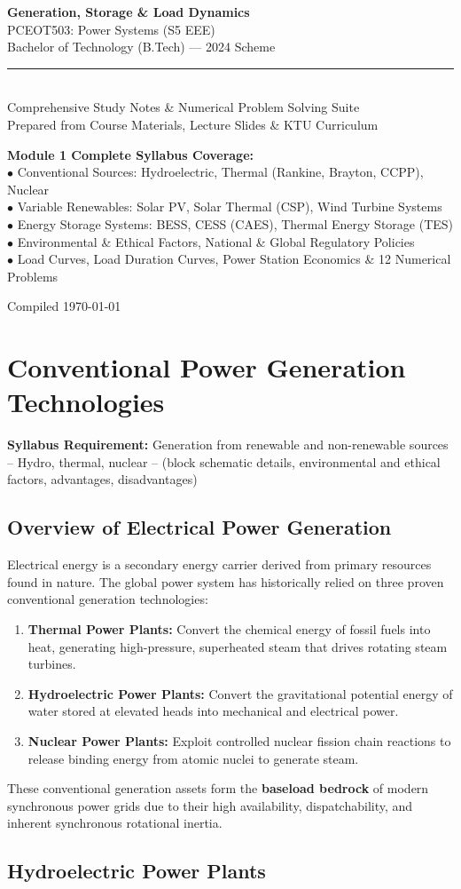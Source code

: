 \documentclass[11pt,a4paper]{article}
\newcommand{\docsubject}{PCEOT503: Power Systems (S5 EEE)}
\newcommand{\doctitle}{Generation, Storage \& Load Dynamics}
\newcommand{\syllabusitem}[1]{%
  \begin{tcolorbox}[enhanced, colback=AnthOrange!8, colframe=AnthOrange, boxrule=0.4pt, arc=3pt, left=7pt, right=7pt, top=3pt, bottom=3pt]
    \small\sffamily\textbf{\color{AnthOrange}Syllabus Requirement:} #1
  \end{tcolorbox}
}
\newcommand{\maketitlepage}{%
  \begin{titlepage}
    \pagecolor{AnthDark}
    \color{AnthLight}
    \vspace*{2.2cm}
    \begin{center}
      {\huge\bfseries\sffamily \doctitle}\\[0.8em]
      {\Large\sffamily\color{AnthOrange} \docsubject}\\[0.4em]
      {\large\sffamily\color{AnthMidGray} Bachelor of Technology (B.Tech) — 2024 Scheme}\\[2.0em]
      \color{AnthOrange}\rule{0.5\textwidth}{1.2pt}\\[1.8em]
      {\normalsize\sffamily\color{AnthLightGray} Comprehensive Study Notes \& Numerical Problem Solving Suite}\\[0.4em]
      {\small\sffamily\color{AnthMidGray} Prepared from Course Materials, Lecture Slides \& KTU Curriculum}\\[2.8em]
      \begin{tcolorbox}[enhanced, width=0.84\textwidth, colback=AnthDark!90, colframe=AnthOrange!60, arc=4pt, boxrule=0.6pt]
        \centering\small\sffamily\color{AnthLight}
        \textbf{Module 1 Complete Syllabus Coverage:}\\[3pt]
        $\bullet$ Conventional Sources: Hydroelectric, Thermal (Rankine, Brayton, CCPP), Nuclear\\
        $\bullet$ Variable Renewables: Solar PV, Solar Thermal (CSP), Wind Turbine Systems\\
        $\bullet$ Energy Storage Systems: BESS, CESS (CAES), Thermal Energy Storage (TES)\\
        $\bullet$ Environmental \& Ethical Factors, National \& Global Regulatory Policies\\
        $\bullet$ Load Curves, Load Duration Curves, Power Station Economics \& 12 Numerical Problems
      \end{tcolorbox}
      \vfill
      {\small\sffamily\color{AnthMidGray} Compiled \today}
    \end{center}
    \vspace*{0.8cm}
  \end{titlepage}
  \pagecolor{AnthLight}
  \color{AnthDark}
}
\begin{document}
\maketitlepage

\thispagestyle{empty}
{
  \hypersetup{hidelinks}
  \tableofcontents
}
\clearpage

\section{Conventional Power Generation Technologies}

\syllabusitem{Generation from renewable and non-renewable sources -- Hydro, thermal, nuclear -- (block schematic details, environmental and ethical factors, advantages, disadvantages)}

\subsection{Overview of Electrical Power Generation}

Electrical energy is a secondary energy carrier derived from primary resources found in nature. The global power system has historically relied on three proven conventional generation technologies:
\begin{enumerate}
  \item \textbf{Thermal Power Plants:} Convert the chemical energy of fossil fuels into heat, generating high-pressure, superheated steam that drives rotating steam turbines.
  \item \textbf{Hydroelectric Power Plants:} Convert the gravitational potential energy of water stored at elevated heads into mechanical and electrical power.
  \item \textbf{Nuclear Power Plants:} Exploit controlled nuclear fission chain reactions to release binding energy from atomic nuclei to generate steam.
\end{enumerate}

These conventional generation assets form the \textbf{baseload bedrock} of modern synchronous power grids due to their high availability, dispatchability, and inherent synchronous rotational inertia.

\subsection{Hydroelectric Power Plants}
\end{document}
